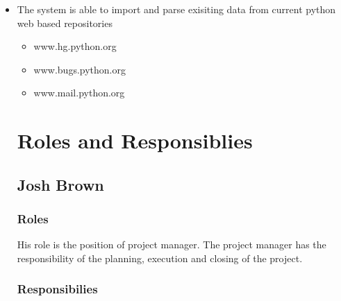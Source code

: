\begin{itemize}
	\item The system is able to import and parse exisiting data from current python web based repositories
	\begin{itemize}
		\item www.hg.python.org
		\item www.bugs.python.org
		\item www.mail.python.org
\end{itemize}


\section{Roles and Responsiblies}


\subsection{Josh Brown}

\subsubsection{Roles}

	His role is the position of project manager. The project manager has the responsibility of the planning, execution and closing of the project.


\subsubsection{Responsibilies}


\end{itemize}
